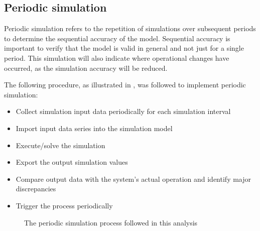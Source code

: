 	\subsection{Periodic simulation}	
		Periodic simulation refers to the repetition of simulations over subsequent periods to determine the sequential accuracy of the model. Sequential accuracy is important to verify that the model is valid in general and not just for a single period. This simulation will also indicate where operational changes have occurred, as the simulation accuracy will be reduced.
		\par 
		The following procedure, as illustrated in , was followed to implement periodic simulation: 
		\begin{itemize}
			\item Collect simulation input data periodically for each simulation interval
			\item Import input data series into the simulation model
			\item Execute/solve the simulation
			\item Export the output simulation values
			\item Compare output data with the system's actual operation and identify major discrepancies
			\item Trigger the process periodically
		\end{itemize}
		\begin{figure}[h]
			\centering
			\caption{The periodic simulation process followed in this analysis}
			\label{fig: PeriodicProcess}
		\end{figure}
	
